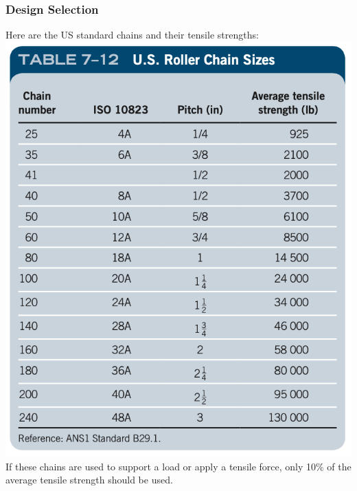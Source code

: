 \documentclass[11pt, fleqn]{article}
\begin{document}
\subsubsection{Design Selection}
Here are the US standard chains and their tensile strengths:\\
\includegraphics[scale=0.35]{Belts/us-chains.png}\\
If these chains are used to support a load or apply a tensile force, only 10$\%$ of the average tensile strength should be used.
\end{document}
